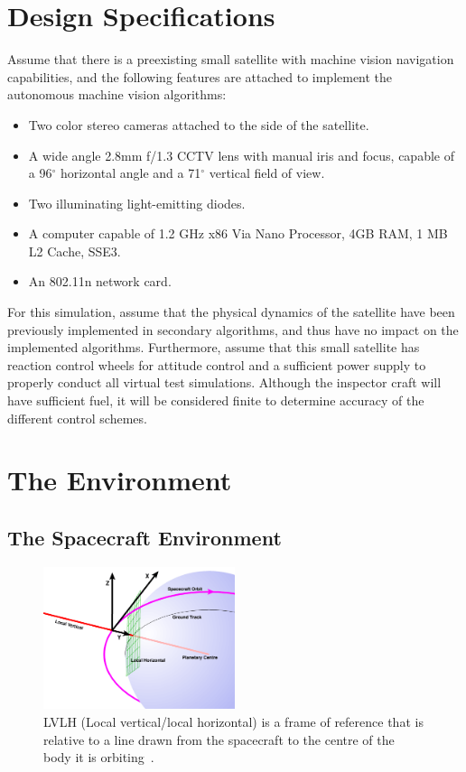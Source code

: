 \documentclass[journal, 10pt]{IEEEtran}
\begin{document}
\section{Design Specifications}
Assume that there is a preexisting small satellite with machine vision navigation capabilities, and the following features are attached to implement the autonomous machine vision algorithms:
\begin{itemize}
\item Two color stereo cameras attached to the side of the satellite.
\item A wide angle 2.8mm f/1.3 CCTV lens with manual iris and focus, capable of a 96$^{\circ}$ horizontal angle and a 71$^{\circ}$ vertical field of view.
\item Two illuminating light-emitting diodes.
\item A computer capable of 1.2 GHz x86 Via Nano Processor, 4GB RAM, 1 MB L2 Cache, SSE3.
\item An 802.11n network card.
\end{itemize}
\cite{Vertigo2, Vertigo3, virt_sim, lens}

For this simulation, assume that the physical dynamics of the satellite have been previously implemented in secondary algorithms, and thus have no impact on the implemented algorithms. Furthermore, assume that this small satellite has reaction control wheels for attitude control and a sufficient power supply to properly conduct all virtual test simulations.  Although the inspector craft will have sufficient fuel, it will be considered finite to determine accuracy of the different control schemes.

\section{The Environment}
\subsection{The Spacecraft Environment}
\begin{figure}[tb]
\begin{center}
\includegraphics[width=0.5\textwidth]{figures/lvlh.png}
\caption{LVLH (Local vertical/local horizontal) is a frame of reference that is relative to a line drawn from the spacecraft to the centre of the body it is orbiting~\cite{lvlh}.}
\label{lvlh_diagram}
\end{center}
\end{figure}
\end{document}
